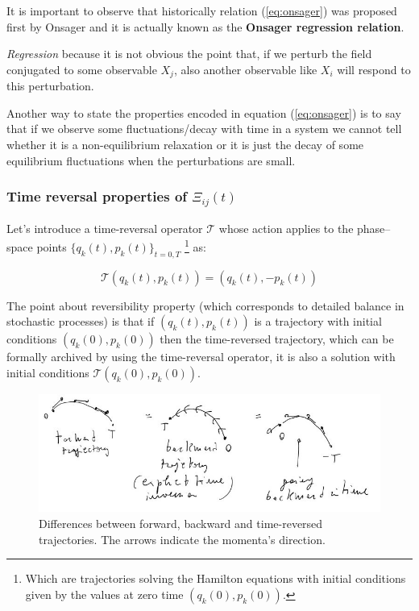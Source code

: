 \documentclass[\main/main.tex]{subfiles}
\begin{document}
It is important to observe that historically relation (\ref{eq:onsager}) was proposed first by Onsager and it is actually known as the \textbf{Onsager regression relation}.

\textit{Regression} because it is not obvious the point that, if we perturb the field conjugated to some observable $X_j$, also another observable like $X_i$ will respond to this perturbation.

Another way to state the properties encoded in equation (\ref{eq:onsager}) is to say that if we observe some fluctuations/decay with time in a system we cannot tell whether it is a non-equilibrium relaxation or it is just the decay of some equilibrium fluctuations when the perturbations are small.

\subsubsection{Time reversal properties of $\Xi_{ij}(t)$}
Let's introduce a time-reversal
operator $\mathcal{T}$ whose action applies to the phase–space points $\{q_k(t),p_k(t)\}_{t=0,T}\,\,$\footnote{Which are trajectories solving the Hamilton equations with initial conditions given by the values at zero time $(q_k(0),p_k(0))$.} as:

\begin{equation}
   \mathcal{T}\left(q_{k}(t), p_{k}(t)\right)=\left(q_{k}(t),-p_{k}(t)\right)
\end{equation}

The point about reversibility property (which corresponds to detailed balance in stochastic processes) is that if $(q_k(t),p_k(t))$ is a trajectory with initial conditions $(q_k(0),p_k(0))$ then the time-reversed trajectory, which can be formally archived by using the time-reversal operator, it is also a solution with initial conditions $\mathcal{T}(q_k(0),p_k(0))$.

\begin{figure}[ht]
    \centering
    \includegraphics[width=0.7\linewidth]{Lectures/Images/prova.jpg}
    \caption{Differences between forward, backward and time-reversed trajectories. The arrows indicate the momenta's direction.}
    \label{fig:my_label}
\end{figure}
\end{document}

